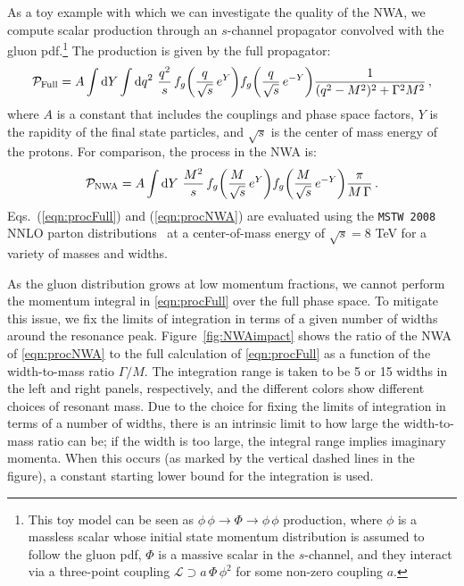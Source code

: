 \documentclass[a4paper,12pt]{article}
\begin{document}
As a toy example with which we can investigate the quality of the NWA, we compute scalar production through an $s$-channel propagator convolved with the gluon pdf.\footnote{This toy model can be seen as $\phi\,\phi \rightarrow \Phi \rightarrow \phi\, \phi$ production, where $\phi$ is a massless scalar whose initial state momentum distribution is assumed to follow the gluon pdf, $\Phi$ is a massive scalar in the $s$-channel, and they interact via a three-point coupling $\mathcal{L} \supset a\,\Phi\,\phi^2$ for some non-zero coupling $a$.}  The production is given by the full propagator:
\begin{equation}
\mathcal{P}_{\rm{Full}} = A \int \text{d}Y \int \text{d}q^2 ~ \frac{q^2}{s}\,f_g \bigg(\frac{q}{\sqrt{s}}\, e^Y\bigg) f_g \bigg(\frac{q}{\sqrt{s}}\, e^{-Y} \bigg) \frac{1}{(q^2 - M^2)^2 + \Gamma^2 M^2}\, ,
\label{eqn:procFull}
\end{equation}
where $A$ is a constant that includes the couplings and phase space factors, $Y$ is the rapidity of the final state particles, and $\sqrt{s}$ is the center of mass energy of the protons.  For comparison, the process in the NWA is:
\begin{equation}
\mathcal{P}_{\rm{NWA}} = A \int \text{d}Y  ~ \frac{M^2}{s}\,f_g \bigg(\frac{M}{\sqrt{s}}\, e^Y\bigg) f_g \bigg(\frac{M}{\sqrt{s}}\, e^{-Y} \bigg) \frac{\pi}{M\, \Gamma} \,.
\label{eqn:procNWA}
\end{equation}
Eqs.~(\ref{eqn:procFull}) and (\ref{eqn:procNWA}) are evaluated using the \texttt{MSTW 2008} NNLO parton distributions~\cite{Martin:2009iq, Martin:2009bu, Martin:2010db} at a center-of-mass energy of $\sqrt{s}=8$ TeV for a variety of masses and widths.

As the gluon distribution grows at low momentum fractions, we cannot perform the momentum integral in \cref{eqn:procFull} over the full phase space. To mitigate this issue, we fix the limits of integration in terms of a given number of widths around the resonance peak. Figure~\ref{fig:NWAimpact} shows the ratio of the NWA of \cref{eqn:procNWA} to the full calculation of \cref{eqn:procFull} as a function of the width-to-mass ratio $\Gamma/M$.  The integration range is taken to be 5 or 15 widths in the left and right panels, respectively, and the different colors show different choices of resonant mass.  Due to the choice for fixing the limits of integration in terms of a number of widths, there is an intrinsic limit to how large the width-to-mass ratio can be; if the width is too large, the integral range implies imaginary momenta.  When this occurs (as marked by the vertical dashed lines in the figure), a constant starting lower bound for the integration is used. 
\end{document}
